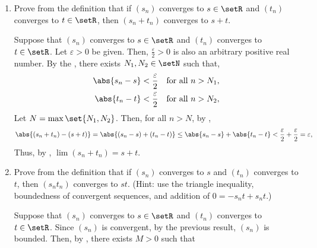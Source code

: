 \begin{enumerate}
\begin{subprove}
    \textbf{Case 2:} Suppose that \(k \neq 0\).
    \(\frac{\varepsilon}{\abs{k}} > 0\) is also an arbitrary positive real number since \(\abs{k} > 0\).
    Then, there exists \(N \in \setN\) such that
    \[
      \abs{s_n - s} < \frac{\varepsilon}{\abs{k}} \quad\text{for all } n > N.
    \]
    Then, for all \(n > N\), it follows that
    \[
      \abs{k s_n - k s} = \abs{k} \cdot \abs{s_n - s} < \abs{k} \cdot \frac{\varepsilon}{\abs{k}} = \varepsilon.
    \]
    Thus, by definition, \(\lim (k s_n) = k s\).\proofstep
    Therefore, proved by cases, \(\lim (k s_n) = k s\).
  \end{subprove}
  \item Prove from the definition that if \((s_n)\) converges to \(s \in \setR\) and \((t_n)\) converges to \(t \in \setR\), then \((s_n + t_n)\) converges to \(s + t\).
  \begin{subprove}
    Suppose that \((s_n)\) converges to \(s \in \setR\) and \((t_n)\) converges to \(t \in \setR\).
    Let \(\varepsilon > 0\) be given. Then, 
    \(\frac{\varepsilon}{2} > 0\) is also an arbitrary positive real number.
    By the , there exists \(N_1, N_2 \in \setN\) such that,
    \begin{align*}
      \abs{s_n - s} < \frac{\varepsilon}{2} \quad\text{for all } n > N_1, \\
      \abs{t_n - t} < \frac{\varepsilon}{2} \quad\text{for all } n > N_2,
    \end{align*}
    Let \(N = \max\set{N_1, N_2}\). Then, for all \(n > N\), by ,
    \begin{align*}
      \abs{(s_n + t_n) - (s + t)} = \abs{(s_n - s) + (t_n - t)} \leq \abs{s_n - s} + \abs{t_n - t} < \frac{\varepsilon}{2} + \frac{\varepsilon}{2} = \varepsilon,
    \end{align*}
    Thus, by , \(\lim (s_n + t_n) = s + t\).
  \end{subprove}
  \item Prove from the definition that if \((s_n)\) converges to \(s\) and \((t_n)\) converges to \(t\), then \((s_n t_n)\) converges to \(s t\). (Hint: use the triangle inequality, boundedness of convergent sequences, and addition of \(0 = -s_n t + s_n t\).)
  \begin{subprove}
    Suppose that \((s_n)\) converges to \(s \in \setR\) and \((t_n)\) converges to \(t \in \setR\).
    Since \((s_n)\) is convergent, by the previous result, \((s_n)\) is bounded.
    Then, by , there exists \(M > 0\) such that

\end{subprove}
\end{enumerate}
